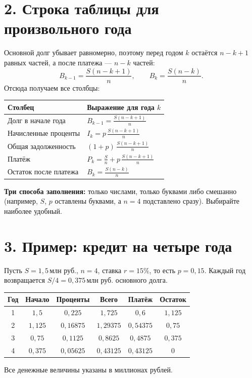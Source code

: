 \documentclass[a4paper,12pt]{article}
\newcommand{\mln}{\,\text{млн руб.}}
\begin{document}
\section*{2. Строка таблицы для произвольного года}

Основной долг убывает равномерно, поэтому перед годом $k$ остаётся $n-k+1$ равных частей, а после платежа --- $n-k$ частей:
\[
B_{k-1}=\frac{S(n-k+1)}{n},\qquad
B_k=\frac{S(n-k)}{n}.
\]
Отсюда получаем все столбцы:
\begin{center}
\renewcommand{\arraystretch}{1.16}
\begin{tabularx}{\linewidth}{@{}>{\raggedright\arraybackslash}X >{\raggedright\arraybackslash}X@{}}
\toprule
Столбец & Выражение для года $k$ \\
\midrule
Долг в начале года & $\displaystyle B_{k-1}=\frac{S(n-k+1)}{n}$ \\
Начисленные проценты & $\displaystyle I_k=p\,\frac{S(n-k+1)}{n}$ \\
Общая задолженность & $\displaystyle (1+p)\,\frac{S(n-k+1)}{n}$ \\
Платёж & $\displaystyle P_k=\frac Sn+p\,\frac{S(n-k+1)}n$ \\
Остаток после платежа & $\displaystyle B_k=\frac{S(n-k)}{n}$ \\
\bottomrule
\end{tabularx}
\end{center}

\textbf{Три способа заполнения:} только числами, только буквами либо смешанно (например, $S$, $p$ оставлены буквами, а $n=4$ подставлено сразу). Выбирайте наиболее удобный.

\clearpage
\section*{3. Пример: кредит на четыре года}

Пусть $S=1{,}5\mln$, $n=4$, ставка $r=15\%$, то есть $p=0{,}15$. Каждый год возвращается $S/4=0{,}375\mln$ основного долга.

\begin{center}
\small
\renewcommand{\arraystretch}{1.40}
\begin{tabular}{@{}c c c c c c@{}}
\toprule
Год & Начало & Проценты & Всего & Платёж & Остаток \\
\midrule
1 & $1{,}5$ & $0{,}225$ & $1{,}725$ & $0{,}6$ & $1{,}125$ \\
2 & $1{,}125$ & $0{,}16875$ & $1{,}29375$ & $0{,}54375$ & $0{,}75$ \\
3 & $0{,}75$ & $0{,}1125$ & $0{,}8625$ & $0{,}4875$ & $0{,}375$ \\
4 & $0{,}375$ & $0{,}05625$ & $0{,}43125$ & $0{,}43125$ & $0$ \\
\bottomrule
\end{tabular}
\end{center}
\begin{center}\small Все денежные величины указаны в миллионах рублей.\end{center}
\end{document}
